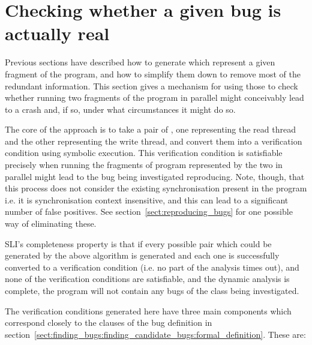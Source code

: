 \section{Checking whether a given bug is actually real}

Previous sections have described how to generate {\StateMachines}
which represent a given fragment of the program, and how to simplify
them down to remove most of the redundant information.  This section
gives a mechanism for using those {\StateMachines} to check whether
running two fragments of the program in parallel might conceivably
lead to a crash and, if so, under what circumstances it might do so.

The core of the approach is to take a pair of {\StateMachines}, one
representing the read thread and the other representing the write
thread, and convert them into a verification condition using symbolic
execution.  This verification condition is satisfiable precisely when
running the fragments of program represented by the two
{\StateMachines} in parallel might lead to the bug being investigated
reproducing.  Note, though, that this process does not consider the
existing synchronisation present in the program i.e. it is
synchronisation context insensitive, and this can lead to a
significant number of false positives.  See
section~\ref{sect:reproducing_bugs} for one possible way of
eliminating these.

SLI's completeness property is that if every possible \StateMachine
pair which could be generated by the above algorithm is generated and
each one is successfully converted to a verification condition
(i.e. no part of the analysis times out), and none of the verification
conditions are satisfiable, and the dynamic analysis is complete, the
program will not contain any bugs of the class being investigated.

The verification conditions generated here have three main components
which correspond closely to the clauses of the bug definition in
section~\ref{sect:finding_bugs:finding_candidate_bugs:formal_definition}.
These are:

